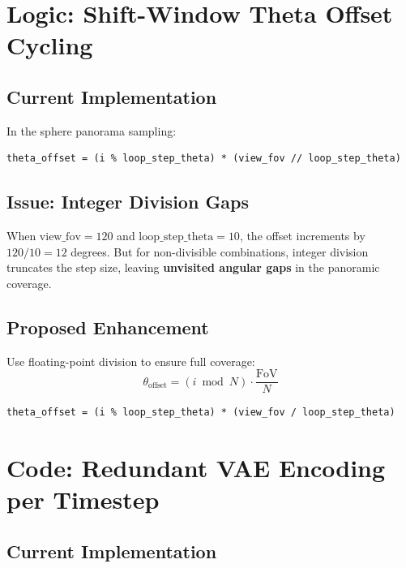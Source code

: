 \documentclass[11pt,a4paper]{article}
\begin{document}
\section{Logic: Shift-Window Theta Offset Cycling}

\subsection{Current Implementation}

In the sphere panorama sampling:
\begin{lstlisting}
theta_offset = (i % loop_step_theta) * (view_fov // loop_step_theta)
\end{lstlisting}

\subsection{Issue: Integer Division Gaps}

When $\text{view\_fov} = 120$ and $\text{loop\_step\_theta} = 10$, the offset increments by $120 / 10 = 12$ degrees.
But for non-divisible combinations, integer division truncates the step size, leaving \textbf{unvisited angular gaps} in the panoramic coverage.

\subsection{Proposed Enhancement}

Use floating-point division to ensure full coverage:
\begin{equation}
    \theta_{\text{offset}} = (i \bmod N) \cdot \frac{\text{FoV}}{N}
\end{equation}
\begin{lstlisting}
theta_offset = (i % loop_step_theta) * (view_fov / loop_step_theta)
\end{lstlisting}

\section{Code: Redundant VAE Encoding per Timestep}

\subsection{Current Implementation}
\end{document}
